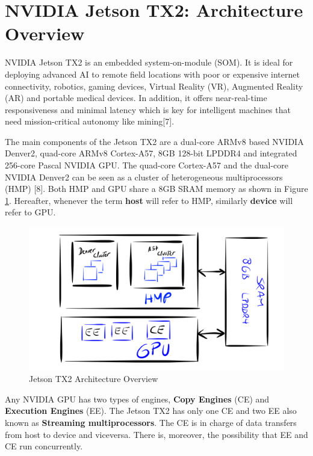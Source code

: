 \documentclass[
  12pt,
  a4paperpaper,
]{report}
\begin{document}
\hypertarget{nvidia-jetson-tx2-architecture-overview}{%
\section{NVIDIA Jetson TX2: Architecture
Overview}\label{nvidia-jetson-tx2-architecture-overview}}

NVIDIA Jetson TX2 is an embedded system-on-module (SOM). It is ideal for
deploying advanced AI to remote field locations with poor or expensive
internet connectivity, robotics, gaming devices, Virtual Reality (VR),
Augmented Reality (AR) and portable medical devices. In addition, it
offers near-real-time responsiveness and minimal latency which is key for
intelligent machines that need mission-critical autonomy like mining{[}7{]}.

The main components of the Jetson TX2 are a dual-core ARMv8 based NVIDIA
Denver2, quad-core ARMv8 Cortex-A57, 8GB 128-bit LPDDR4 and integrated
256-core Pascal NVIDIA GPU. The quad-core Cortex-A57 and the dual-core
NVIDIA Denver2 can be seen as a cluster of heterogeneous multiprocessors
(HMP) {[}8{]}. Both HMP and GPU share a 8GB SRAM memory as shown in
Figure \ref{img:overview_arch}. Hereafter, whenever the term
\textbf{host} will refer to HMP, similarly  \textbf{device} will refer to GPU.

\begin{figure}
\centering
\includegraphics[width=1\textwidth,height=\textheight]{source/figures/overview_arch.png}
\caption{Jetson TX2 Architecture Overview \label{img:overview_arch}}
\end{figure}

Any NVIDIA GPU has two types of engines, \textbf{Copy Engines} (CE) and
\textbf{Execution Engines} (EE). The Jetson TX2 has only one CE and two
EE also known as \textbf{Streaming multiprocessors}. The CE is in charge of
data transfers from host to device and viceversa. There is, moreover,
the possibility that EE and CE run concurrently.
\end{document}
